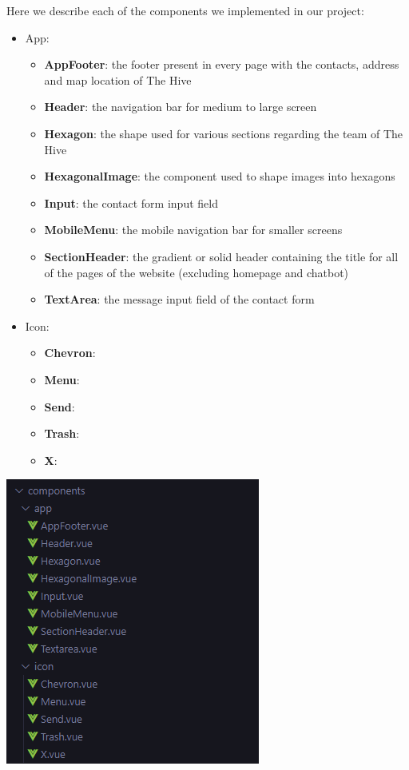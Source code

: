 Here we describe each of the components we implemented in our project:
\begin{itemize}
    \item App:
    \begin{itemize}
        \item \textbf{AppFooter}: the footer present in every page with the contacts, address and map location of The Hive
        \item \textbf{Header}: the navigation bar for medium to large screen
        \item \textbf{Hexagon}: the shape used for various sections regarding the team of The Hive
        \item \textbf{HexagonalImage}: the component used to shape images into hexagons
        \item \textbf{Input}: the contact form input field
        \item \textbf{MobileMenu}: the mobile navigation bar for smaller screens
        \item \textbf{SectionHeader}: the gradient or solid header containing the title for all of the pages of the website (excluding homepage and chatbot)
        \item \textbf{TextArea}: the message input field of the contact form
    \end{itemize}

    \item Icon:
    \begin{itemize}
        \item \textbf{Chevron}:
        \item \textbf{Menu}:
        \item \textbf{Send}:
        \item \textbf{Trash}:
        \item \textbf{X}:
    \end{itemize}
\end{itemize}


\begin{center}
    \includegraphics[width=0.4\linewidth]{img/components-structure.png}
\end{center}


